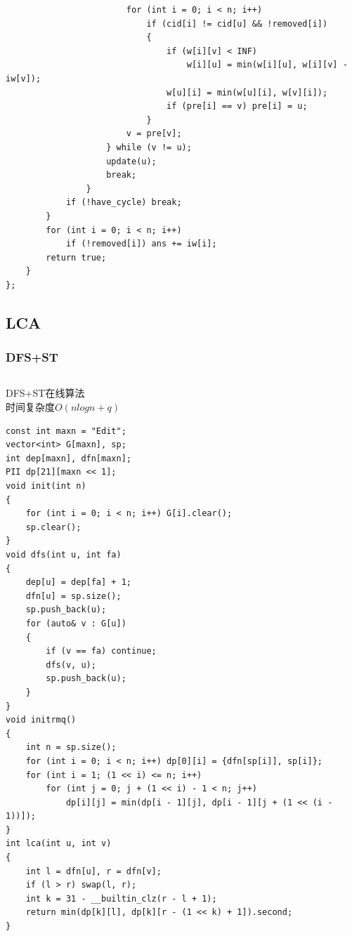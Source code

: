 \documentclass[twoside]{article}
\begin{document}
\begin{lstlisting}
                        for (int i = 0; i < n; i++)
                            if (cid[i] != cid[u] && !removed[i])
                            {
                                if (w[i][v] < INF)
                                    w[i][u] = min(w[i][u], w[i][v] - iw[v]);
                                w[u][i] = min(w[u][i], w[v][i]);
                                if (pre[i] == v) pre[i] = u;
                            }
                        v = pre[v];
                    } while (v != u);
                    update(u);
                    break;
                }
            if (!have_cycle) break;
        }
        for (int i = 0; i < n; i++)
            if (!removed[i]) ans += iw[i];
        return true;
    }
};\end{lstlisting}
\subsection{LCA}
\subsubsection{DFS+ST}
\begin{lstlisting}
\end{lstlisting}
DFS+ST在线算法\\
时间复杂度$O(nlogn+q)$
\begin{lstlisting}
const int maxn = "Edit";
vector<int> G[maxn], sp;
int dep[maxn], dfn[maxn];
PII dp[21][maxn << 1];
void init(int n)
{
    for (int i = 0; i < n; i++) G[i].clear();
    sp.clear();
}
void dfs(int u, int fa)
{
    dep[u] = dep[fa] + 1;
    dfn[u] = sp.size();
    sp.push_back(u);
    for (auto& v : G[u])
    {
        if (v == fa) continue;
        dfs(v, u);
        sp.push_back(u);
    }
}
void initrmq()
{
    int n = sp.size();
    for (int i = 0; i < n; i++) dp[0][i] = {dfn[sp[i]], sp[i]};
    for (int i = 1; (1 << i) <= n; i++)
        for (int j = 0; j + (1 << i) - 1 < n; j++)
            dp[i][j] = min(dp[i - 1][j], dp[i - 1][j + (1 << (i - 1))]);
}
int lca(int u, int v)
{
    int l = dfn[u], r = dfn[v];
    if (l > r) swap(l, r);
    int k = 31 - __builtin_clz(r - l + 1);
    return min(dp[k][l], dp[k][r - (1 << k) + 1]).second;
}
\end{lstlisting}
\end{document}
